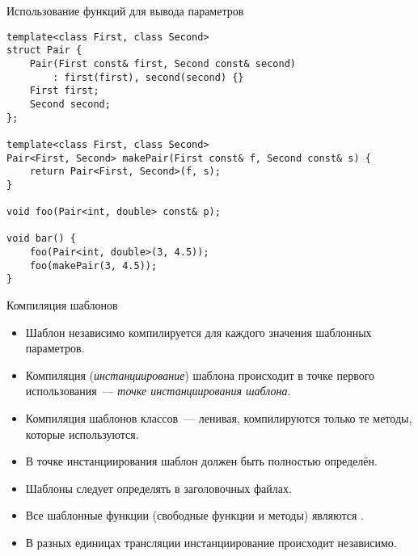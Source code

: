 \documentclass{beamer}
\begin{document}
\begin{frame}[fragile]{Использование функций для вывода параметров}
\small
    \begin{lstlisting}
template<class First, class Second>
struct Pair {
    Pair(First const& first, Second const& second)
        : first(first), second(second) {}
    First first;
    Second second;
};

template<class First, class Second>
Pair<First, Second> makePair(First const& f, Second const& s) {
    return Pair<First, Second>(f, s);
}

void foo(Pair<int, double> const& p);

void bar() {   
    foo(Pair<int, double>(3, 4.5));
    foo(makePair(3, 4.5));
}
    \end{lstlisting}
\end{frame}

\begin{frame}[fragile]{Компиляция шаблонов}
\small
    \begin{itemize}
        \item Шаблон независимо компилируется для каждого значения шаблонных
            параметров.

        \item Компиляция ({\em инстанциирование}) шаблона происходит в точке первого использования~---
            {\em точке инстанциирования шаблона}.

        \item Компиляция шаблонов классов~— ленивая, компилируются только те методы,
            которые используются.
        
        \item В точке инстанциирования шаблон должен быть полностью определён.

        \item Шаблоны следует определять в заголовочных файлах.

        \item Все шаблонные функции (свободные функции и методы) являются
            .

        \item В разных единицах трансляции инстанциирование происходит
            независимо.
    \end{itemize}
\end{frame}
\end{document}
